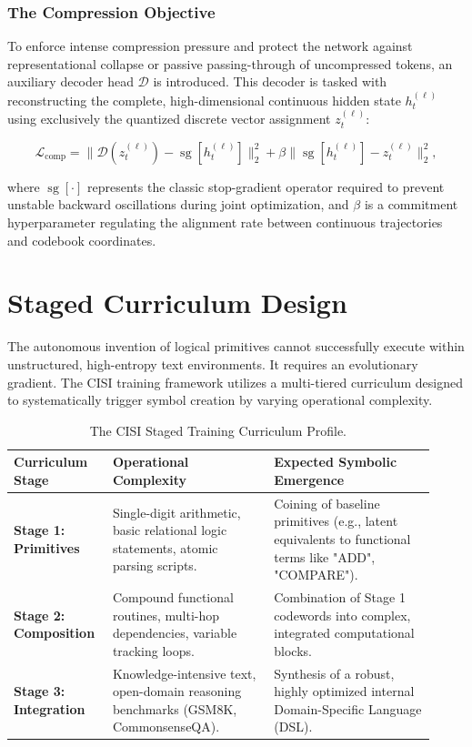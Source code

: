 \subsection{The Compression Objective}
To enforce intense compression pressure and protect the network against representational collapse or passive passing-through of uncompressed tokens, an auxiliary decoder head $\mathcal{D}$ is introduced. This decoder is tasked with reconstructing the complete, high-dimensional continuous hidden state $h_t^{(\ell)}$ using exclusively the quantized discrete vector assignment $z_t^{(\ell)}$:

\begin{equation}
\mathcal{L}_{\text{comp}} = \| \mathcal{D}\left(z_t^{(\ell)}\right) - \operatorname{sg}[h_t^{(\ell)}] \|_2^2 + \beta \| \operatorname{sg}[h_t^{(\ell)}] - z_t^{(\ell)} \|_2^2,
\end{equation}

where $\operatorname{sg}[\cdot]$ represents the classic stop-gradient operator required to prevent unstable backward oscillations during joint optimization, and $\beta$ is a commitment hyperparameter regulating the alignment rate between continuous trajectories and codebook coordinates.

\chapter{Staged Curriculum Design}

The autonomous invention of logical primitives cannot successfully execute within unstructured, high-entropy text environments. It requires an evolutionary gradient. The CISI training framework utilizes a multi-tiered curriculum designed to systematically trigger symbol creation by varying operational complexity.

\begin{table}[h]
\centering
\small
\begin{tabular}{p{0.20\linewidth}p{0.36\linewidth}p{0.36\linewidth}}
\hline
\textbf{Curriculum Stage} & \textbf{Operational Complexity} & \textbf{Expected Symbolic Emergence} \\
\hline
\textbf{Stage 1: Primitives} & Single-digit arithmetic, basic relational logic statements, atomic parsing scripts. & Coining of baseline primitives (e.g., latent equivalents to functional terms like "ADD", "COMPARE"). \\
\textbf{Stage 2: Composition} & Compound functional routines, multi-hop dependencies, variable tracking loops. & Combination of Stage 1 codewords into complex, integrated computational blocks. \\
\textbf{Stage 3: Integration} & Knowledge-intensive text, open-domain reasoning benchmarks (GSM8K, CommonsenseQA). & Synthesis of a robust, highly optimized internal Domain-Specific Language (DSL). \\
\hline
\end{tabular}
\caption{The CISI Staged Training Curriculum Profile.}
\label{tab:cisi-curriculum}
\end{table}

